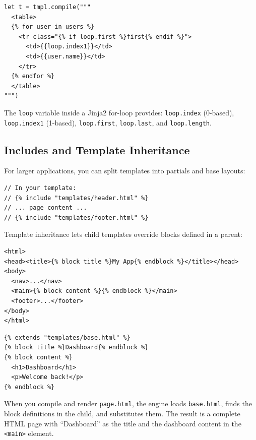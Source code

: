 \begin{lstlisting}[language=Lattice, caption={Jinja2-style for loop}]
let t = tmpl.compile("""
  <table>
  {% for user in users %}
    <tr class="{% if loop.first %}first{% endif %}">
      <td>{{loop.index1}}</td>
      <td>{{user.name}}</td>
    </tr>
  {% endfor %}
  </table>
""")
\end{lstlisting}

The \lstinline|loop| variable inside a Jinja2 for-loop provides:
\lstinline|loop.index| (0-based),
\lstinline|loop.index1| (1-based),
\lstinline|loop.first|,
\lstinline|loop.last|, and
\lstinline|loop.length|.

\subsection{Includes and Template Inheritance}\label{sec:template-includes}


For larger applications, you can split templates into partials and base layouts:

\begin{lstlisting}[language=Lattice, caption={Including a partial}]
// In your template:
// {% include "templates/header.html" %}
// ... page content ...
// {% include "templates/footer.html" %}
\end{lstlisting}

Template inheritance lets child templates override blocks defined in a parent:

\begin{lstlisting}[language={}, caption={base.html --- a base layout}]
<html>
<head><title>{% block title %}My App{% endblock %}</title></head>
<body>
  <nav>...</nav>
  <main>{% block content %}{% endblock %}</main>
  <footer>...</footer>
</body>
</html>
\end{lstlisting}

\begin{lstlisting}[language={}, caption={page.html --- a child template}]
{% extends "templates/base.html" %}
{% block title %}Dashboard{% endblock %}
{% block content %}
  <h1>Dashboard</h1>
  <p>Welcome back!</p>
{% endblock %}
\end{lstlisting}

When you compile and render \texttt{page.html}, the engine loads \texttt{base.html}, finds the block definitions in the child, and substitutes them.
The result is a complete HTML page with ``Dashboard'' as the title and the dashboard content in the \lstinline|<main>| element.

